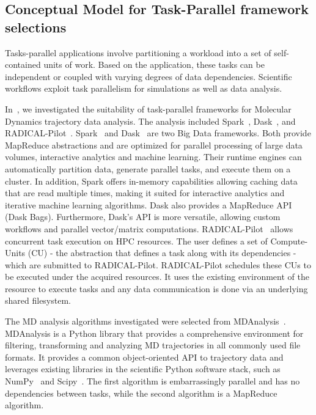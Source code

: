 
\subsection{Conceptual Model for Task-Parallel framework selections}
Tasks-parallel applications involve partitioning a workload into a set of 
self-contained units of work. Based on the application, these tasks can be 
independent or coupled with varying degrees of data dependencies. Scientific 
workflows exploit task parallelism for simulations as well as data analysis.

In~\cite{paraskevakos2018task}, we investigated the suitability of task-parallel 
frameworks for Molecular Dynamics trajectory data analysis. The analysis included 
Spark~\cite{zaharia2010spark}, Dask~\cite{rocklin2015dask}, and RADICAL-Pilot~\cite{merzky2019using}. 
Spark~\cite{zaharia2010spark} and Dask~\cite{rocklin2015dask} are two Big Data 
frameworks. Both provide MapReduce abstractions and are optimized for parallel 
processing of large data volumes, interactive analytics and machine learning. Their 
runtime engines can automatically partition data, generate parallel tasks, and 
execute them on a cluster. In addition, Spark offers in-memory capabilities allowing 
caching data that are read multiple times, making it suited for interactive 
analytics and iterative machine learning algorithms. Dask also provides a MapReduce 
API (Dask Bags). Furthermore, Dask’s API is more versatile, allowing custom 
workflows and parallel vector/matrix computations. RADICAL-Pilot~\cite{merzky2019using} 
allows concurrent task execution on HPC resources. The user defines a set of 
Compute-Units (CU) - the abstraction that defines a task along with its dependencies - 
which are submitted to RADICAL-Pilot. RADICAL-Pilot schedules these CUs to be 
executed under the acquired resources. It uses the existing environment of the 
resource to execute tasks and any data communication is done via an underlying 
shared filesystem.

The MD analysis algorithms investigated were selected from MDAnalysis~\cite{gowers2016mdanalysis,michaud2011mdanalysis}.
 MDAnalysis is a Python library that provides a comprehensive environment for 
 filtering, transforming and analyzing MD trajectories in all commonly used file 
 formats. It provides a common object-oriented API to trajectory data and leverages 
 existing libraries in the scientific Python software stack, such as NumPy~\cite{numpy} 
 and Scipy~\cite{scipy}. The first algorithm is embarrassingly parallel and has 
 no dependencies between tasks, while the second algorithm is a MapReduce 
 algorithm.

